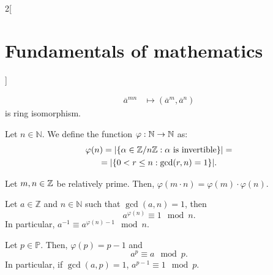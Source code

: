 \documentclass[../../../main.tex]{subfiles}
\begin{document}
\begin{multicols}{2}[\section{Fundamentals of mathematics}]
\begin{theorem}
\begin{align*}
      \overline{a}^{\scriptscriptstyle mn} & \longmapsto(\overline{a}^{\scriptscriptstyle m},\overline{a}^{\scriptscriptstyle n})
    \end{align*}
    is ring isomorphism.
  \end{theorem}
  \begin{definition}
    Let $n\in\mathbb{N}$. We define the function $\varphi:\mathbb{N}\rightarrow\mathbb{N}$ as:
    \begin{multline*}
      \varphi(n)=|\{\textstyle\alpha\in\quot{\ZZ}{n\ZZ}:\alpha \text{ is invertible}\}|=\\=|\{0<r\leq n: \gcd(r,n)=1\}|.
    \end{multline*}
  \end{definition}
  \begin{lemma}
    Let $m,n\in\mathbb{Z}$ be relatively prime. Then, $\varphi(m\cdot n)=\varphi(m)\cdot\varphi(n).$
  \end{lemma}
  \begin{theorem}
    Let $a\in\mathbb{Z}$ and $n\in\mathbb{N}$ such that $\gcd(a,n)=1$, then $$a^{\varphi(n)}\equiv 1\mod n.$$ In particular, $a^{-1}\equiv a^{\varphi(n)-1}\mod n$.
  \end{theorem}
  \begin{theorem}
    Let $p\in\mathbb{P}$. Then, $\varphi(p)=p-1$ and $$a^p\equiv a\mod p.$$ In particular, if $\gcd(a,p)=1$, $a^{p-1}\equiv 1\mod p$.
  \end{theorem}

\end{multicols}
\end{document}
